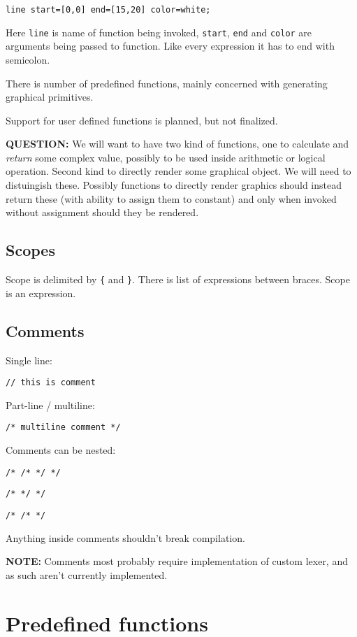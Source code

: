 \documentclass{scrreprt}
\newcommand{\question}[1]{
    \color{red} \textbf{QUESTION:} \color{black} #1
}
\newcommand{\note}[1]{
    \color{blue} \textbf{NOTE:} \color{black} #1
}
\begin{document}
\texttt{line start=[0,0] end=[15,20] color=white;}

Here \texttt{line} is name of function being invoked, \texttt{start}, \texttt{end} and \texttt{color} are arguments being passed to function. Like every expression it has to end with semicolon.

There is number of predefined functions, mainly concerned with generating graphical primitives.

Support for user defined functions is planned, but not finalized.

\question{We will want to have two kind of functions, one to calculate and \textit{return} some complex value, possibly to be used inside arithmetic or logical operation. Second kind to directly render some graphical object. We will need to distuingish these. Possibly functions to directly render graphics should instead return these (with ability to assign them to constant) and only when invoked without assignment should they be rendered.}

\section{Scopes}

Scope is delimited by \texttt{\{} and \texttt{\}}. There is list of expressions between braces. Scope is an expression.


\section{Comments}

Single line:

\texttt{// this is comment}

Part-line / multiline:

\texttt{/* multiline comment */}

Comments can be nested:

\texttt{/* /* */ */}

\texttt{/* */ */}

\texttt{/* /* */}

Anything inside comments shouldn't break compilation.

\note{Comments most probably require implementation of custom lexer, and as such aren't currently implemented.}


\chapter{Predefined functions}
\end{document}
